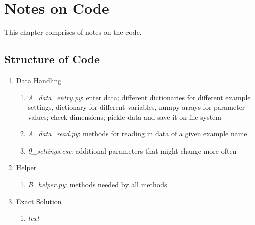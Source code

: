 \chapter{Notes on Code}


This chapter comprises of notes on the code.

\section{Structure of Code}

\begin{enumerate}[noitemsep]
	\item Data Handling
	\begin{enumerate}[noitemsep]
		\item \emph{A\_data\_entry.py}: enter data; different dictionaries for different example settings, dictionary for different variables, numpy arrays for parameter values; check dimensions; pickle data and save it on file system
		\item \emph{A\_data\_read.py}: methods for reading in data of a given example name
		\item \emph{0\_settings.csv}: additional parameters that might change more often
	\end{enumerate}
	\item Helper
	\begin{enumerate}[noitemsep]
		\item \emph{B\_helper.py}: methods needed by all methods
	\end{enumerate}
	\item Exact Solution
	\begin{enumerate}[noitemsep]
		\item \emph{text}
	\end{enumerate}
\end{enumerate}